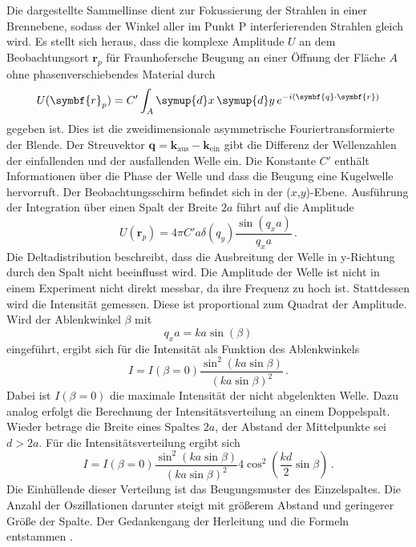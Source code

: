 Die dargestellte Sammellinse dient zur Fokussierung der Strahlen in einer Brennebene,
sodass der Winkel aller im Punkt P interferierenden Strahlen gleich wird.
Es stellt sich heraus, dass die komplexe Amplitude $U$ an dem Beobachtungsort
$\symbf{r}_p$ für Fraunhofersche Beugung an einer Öffnung der Fläche $A$
ohne phasenverschiebendes Material durch
\begin{equation}
  U(\symbf{r}_p) = C' \int_{A} \symup{d}x \, \symup{d}y \, e^{-i(\symbf{q} \cdot \symbf{r})}
  \label{eqn:beugungsintegral}
\end{equation}
gegeben ist. Dies ist die zweidimensionale asymmetrische Fouriertransformierte der
Blende. Der Streuvektor $\symbf{q} = {\symbf{k}}_\text{aus} - {\symbf{k}}_\text{ein}$
gibt die Differenz der Wellenzahlen der einfallenden und der ausfallenden Welle ein.
Die Konstante $C'$ enthält Informationen über die Phase der Welle und dass die Beugung
eine Kugelwelle hervorruft. Der Beobachtungsschirm befindet sich in der ($x$,$y$)-Ebene.
Ausführung der Integration über einen Spalt der Breite $2a$ führt auf die Amplitude
\begin{equation}
  U(\symbf{r}_p) = 4 \pi C' a \delta(q_y) \frac{\sin(q_x a)}{q_x a}\,.
\end{equation}
Die Deltadistribution beschreibt, dass die Ausbreitung der Welle in y-Richtung durch den
Spalt nicht beeinflusst wird. Die Amplitude der Welle ist nicht in einem Experiment nicht
direkt messbar, da ihre Frequenz zu hoch ist. Stattdessen wird die Intensität gemessen.
Diese ist proportional zum Quadrat der Amplitude. Wird der Ablenkwinkel $\beta$ mit
\begin{equation*}
  q_x a = k a \sin(\beta)
\end{equation*}
eingeführt, ergibt sich für die Intensität als Funktion des Ablenkwinkels
\begin{equation}
  I = I(\beta = 0) \frac{\sin^2(k a \sin \beta)}{(k a \sin \beta)^2}\,.
\end{equation}
Dabei ist $I(\beta = 0)$ die maximale Intensität der nicht abgelenkten Welle.
Dazu analog erfolgt die Berechnung der Intensitätsverteilung an einem Doppelspalt.
Wieder betrage die Breite eines Spaltes $2a$, der Abstand der Mittelpunkte sei
$d > 2a$. Für die Intensitätsverteilung ergibt sich
\begin{equation}
  I = I(\beta = 0) \frac{\sin^2(k a \sin \beta)}{(k a \sin \beta )^2} 4 \cos^2 \left (\frac{k d}{2} \sin \beta \right)\,.
\end{equation}
Die Einhüllende dieser Verteilung ist das Beugungsmuster des Einzelspaltes. Die Anzahl
der Oszillationen darunter steigt mit größerem Abstand und geringerer Größe der Spalte.
Der Gedankengang der Herleitung und die Formeln entstammen \cite{Stolze}.
